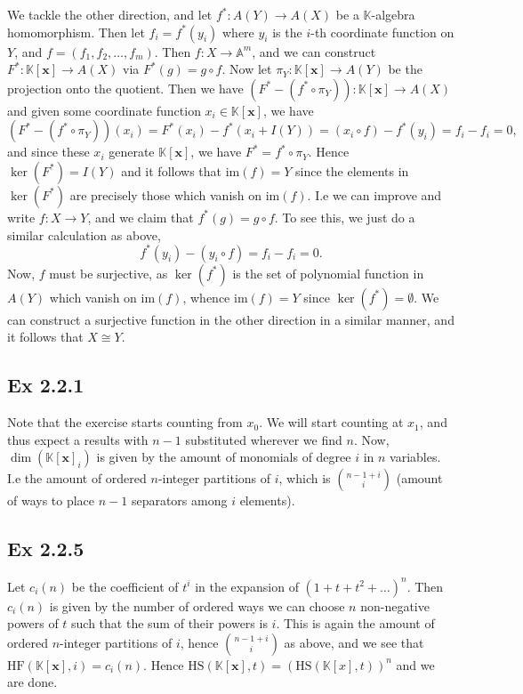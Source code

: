 \documentclass{article}
\theoremstyle{definition}
\newcommand{\K}{\mathbb{K}}
\newcommand{\A}{\mathbb{A}}
\newcommand{\Kx}{\K[\bm{x}]}
\newcommand{\Am}{\A^m}
\newcommand{\HF}{\text{HF}}
\newcommand{\HS}{\text{HS}}
\newcommand{\im}{\text{im}}
\begin{document}
We tackle the other direction, and let $f^*: A(Y) \to A(X)$ be a $\K$-algebra
homomorphism. Then let $f_i = f^*(y_i)$ where $y_i$ is the $i$-th coordinate
function on $Y$, and $f = (f_1, f_2, \ldots, f_m)$. Then $f : X \to \Am$, and
we can construct $F^* : \Kx \to A(X)$ via $F^*(g) = g \circ f$. Now let 
$\pi_Y : \Kx \to A(Y)$ be the projection onto the quotient. Then we have $(F^*
- (f^* \circ \pi_Y)) : \Kx \to A(X)$ and given some coordinate function $x_i
\in \Kx$, we have 
\[
	(F^* - (f^* \circ \pi_Y))(x_i)
	=
	F^*(x_i) - f^*(x_i + I(Y))
	=
	(x_i \circ f) - f^*(y_i)
	=
	f_i - f_i
	=
	0,
\] 
and since these $x_i$ generate $\Kx$, we have $F^* = f^* \circ \pi_Y$. Hence
$\ker(F^*) = I(Y)$ and it follows that $\im(f) = Y$ since the elements in
$\ker(F^*)$ are precisely those which vanish on $\im(f)$. I.e we can improve
and write $f : X \to Y$, and we claim that $f^*(g) = g \circ f$. To see this,
we just do a similar calculation as above,
\[
	f^*(y_i) - (y_i \circ f)
	=
	f_i - f_i
	= 
	0.
\] 
Now, $f$ must be surjective, as $\ker(f^*)$ is the set of polynomial function
in $A(Y)$ which vanish on $\im(f)$, whence $\im(f) = Y$ since $\ker(f^*) =
\emptyset$. We can construct a surjective function in the other direction in a
similar manner, and it follows that $X \cong Y$.

\subsection*{Ex 2.2.1}

Note that the exercise starts counting from $x_0$. We will start counting at
$x_1$, and thus expect a results with $n - 1$ substituted wherever we find $n$.
Now, $\dim(\Kx_i)$ is given by the amount of monomials of degree $i$ in $n$
variables. I.e the amount of ordered $n$-integer partitions of $i$, which is
$\binom{n - 1 + i}{i}$ (amount of ways to place $n - 1$ separators among $i$
elements).

\subsection*{Ex 2.2.5}

Let $c_i(n)$ be the coefficient of $t^i$ in the expansion of $(1 + t + t^2 +
\ldots)^n$. Then $c_i(n)$ is given by the number of ordered ways we can choose
$n$ non-negative powers of $t$ such that the sum of their powers is $i$. This
is again the amount of ordered $n$-integer partitions of $i$, hence $\binom{n -
1 + i}{i}$ as above, and we see that $\HF(\Kx, i) = c_i(n)$. Hence $\HS(\Kx, t)
= (\HS(\K[x], t))^n$ and we are done.
\end{document}
